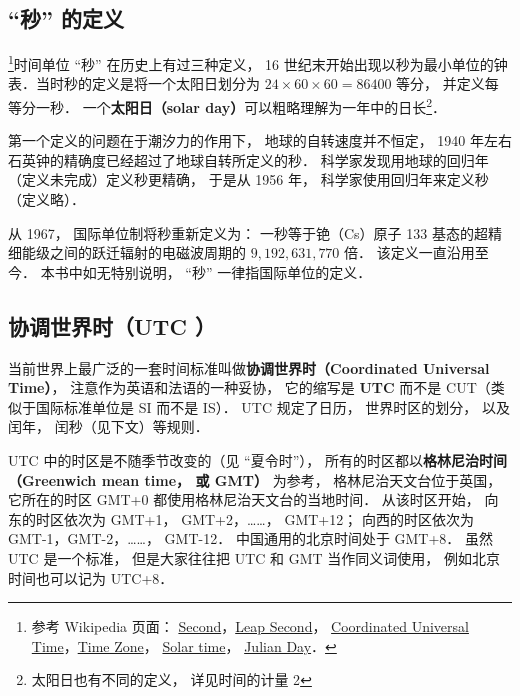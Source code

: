 
\begin{issues}
\end{issues}

\subsection{“秒” 的定义}
\footnote{参考 Wikipedia 页面： \href{https://en.wikipedia.org/wiki/Second}{Second}，\href{https://en.wikipedia.org/wiki/Leap_second}{Leap Second}， \href{https://en.wikipedia.org/wiki/Coordinated_Universal_Time}{Coordinated Universal Time}，\href{https://en.wikipedia.org/wiki/Time_zone}{Time Zone}， \href{https://en.wikipedia.org/wiki/Solar_time}{Solar time}， \href{https://en.wikipedia.org/wiki/Julian_day}{Julian Day}．}时间单位 “秒” 在历史上有过三种定义， 16 世纪末开始出现以秒为最小单位的钟表．当时秒的定义是将一个太阳日划分为 $24\times60\times60 = 86400$ 等分， 并定义每等分一秒． 一个\textbf{太阳日（solar day）}可以粗略理解为一年中的日长\footnote{太阳日也有不同的定义， 详见时间的计量 2}．

第一个定义的问题在于潮汐力的作用下， 地球的自转速度并不恒定， 1940 年左右石英钟的精确度已经超过了地球自转所定义的秒． 科学家发现用地球的回归年（定义未完成）定义秒更精确， 于是从 1956 年， 科学家使用回归年来定义秒（定义略）．

从 1967， 国际单位制将秒重新定义为： 一秒等于铯（Cs）原子 133 基态的超精细能级之间的跃迁辐射的电磁波周期的 $9,192,631,770$ 倍． 该定义一直沿用至今． 本书中如无特别说明， “秒” 一律指国际单位的定义．

\subsection{协调世界时（UTC ）}
当前世界上最广泛的一套时间标准叫做\textbf{协调世界时（Coordinated Universal Time）}， 注意作为英语和法语的一种妥协， 它的缩写是 \textbf{UTC} 而不是 CUT（类似于国际标准单位是 SI 而不是 IS）． UTC 规定了日历， 世界时区的划分， 以及闰年， 闰秒（见下文）等规则．

UTC 中的时区是不随季节改变的（见 “夏令时”）， 所有的时区都以\textbf{格林尼治时间（Greenwich mean time， 或 GMT）} 为参考， 格林尼治天文台位于英国， 它所在的时区 GMT+0 都使用格林尼治天文台的当地时间． 从该时区开始， 向东的时区依次为 GMT+1， GMT+2，……， GMT+12； 向西的时区依次为 GMT-1，GMT-2，……， GMT-12． 中国通用的北京时间处于 GMT+8． 虽然 UTC 是一个标准， 但是大家往往把 UTC 和 GMT 当作同义词使用， 例如北京时间也可以记为 UTC+8．

